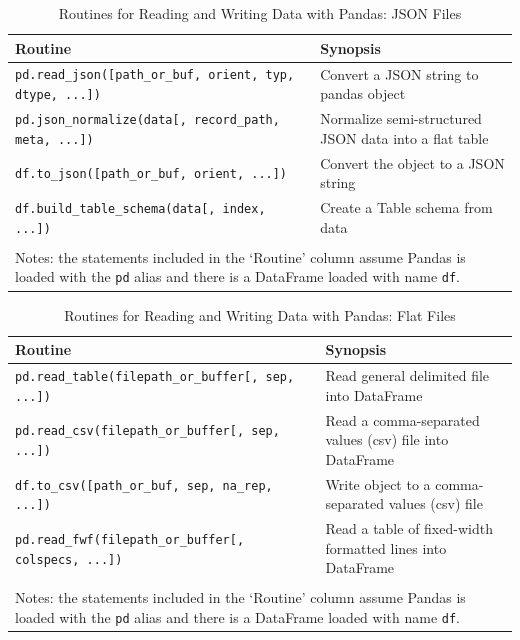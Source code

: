\documentclass[a4paper,11pt]{book}
\begin{document}
\begin{table}
	\centering
	\caption{Routines for Reading and Writing Data with Pandas: JSON Files}
	\label{tab:io_json}
	\begin{tabular}{lp{10cm}}
		\toprule \toprule
			Routine & Synopsis \\
			\midrule
			\texttt{pd.read\_json([path\_or\_buf, orient, typ, dtype, ...])} &
                        Convert a JSON string to pandas object\\
                        \texttt{pd.json\_normalize(data[, record\_path, meta, ...])} &
                        Normalize semi-structured JSON data into a flat table\\
                        \texttt{df.to\_json([path\_or\_buf, orient, ...])} &
                        Convert the object to a JSON string\\
                        \texttt{df.build\_table\_schema(data[, index, ...])} & 
                        Create a Table schema from data\\
			\bottomrule \\[-1.8ex]
		    \multicolumn{2}{l}{Notes: the statements included in the `Routine' column assume Pandas is loaded with the \texttt{pd} alias and there is a DataFrame loaded with name \texttt{df}.} \\
	\end{tabular}
\end{table}

\begin{table}
	\centering
	\caption{Routines for Reading and Writing Data with Pandas: Flat Files}
	\label{tab:io_flat}
	\begin{tabular}{lp{10cm}}
		\toprule \toprule
			Routine & Synopsis \\
			\midrule
			\texttt{pd.read\_table(filepath\_or\_buffer[, sep, ...])} & 
			Read general delimited file into DataFrame\\
			\texttt{pd.read\_csv(filepath\_or\_buffer[, sep, ...])} &
                        Read a comma-separated values (csv) file into DataFrame\\
			\texttt{df.to\_csv([path\_or\_buf, sep, na\_rep, ...])} & 
			Write object to a comma-separated values (csv) file\\ 
			\texttt{pd.read\_fwf(filepath\_or\_buffer[, colspecs, ...])} &
			Read a table of fixed-width formatted lines into DataFrame\\
			\bottomrule \\[-1.8ex]
		    \multicolumn{2}{l}{Notes: the statements included in the `Routine' column assume Pandas is loaded with the \texttt{pd} alias and there is a DataFrame loaded with name \texttt{df}.} \\
	\end{tabular}
\end{table}
\end{document}

